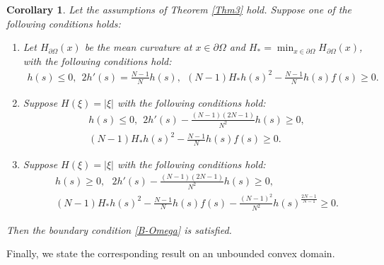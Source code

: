 \documentclass[reqno, 11pt]{amsart} %
\numberwithin{equation}{section}
\newtheorem{cor}[thm]{Corollary}
\theoremstyle{definition}
\newcommand{\pa}{\partial}
\begin{document}
\begin{cor}\label{cor4}
    Let the assumptions of Theorem \ref{Thm3} hold. Suppose one of the following conditions holds:
    \begin{enumerate}[label=(\roman*)]
        \item Let $H_{\pa \Omega}(x)$ be the mean curvature at $x \in \pa \Omega$ and $H_* = \min_{x \in \pa \Omega} H_{\pa \Omega}(x)$, with the following conditions hold:
        \begin{align*}
               h(s) \leq 0, \ \ 2 h'(s) = \frac{N-1}{N}h(s), \ \ (N-1)H_* h(s)^2 - \frac{N-1}{N} h(s) f(s) \geq 0.
        \end{align*}
        \item Suppose $H(\xi)=|\xi|$ with the following conditions hold:
         \begin{align*}
             & h(s) \leq 0, \ \ 2 h'(s) - \frac{(N-1)(2N-1)}{N^2}h(s) \geq 0, \\
             & (N-1)H_* h(s)^2 - \frac{N-1}{N} h(s) f(s) \geq 0.
        \end{align*}
        \item Suppose $H(\xi)=|\xi|$ with the following conditions hold:
         \begin{align*}
             & h(s) \geq 0, \ \ \ 2 h'(s) - \frac{(N-1)(2N-1)}{N^2}h(s) \geq 0, \\
             & (N-1)H_* h(s)^2 - \frac{N-1}{N} h(s) f(s) - \frac{(N-1)^2}{N^2} h(s)^{\frac{2N-1}{N-1}} \geq 0.
        \end{align*}
    \end{enumerate}
    Then the boundary condition \eqref{B-Omega} is satisfied.
\end{cor}



Finally, we state the corresponding result on an unbounded convex domain.
\end{document}
